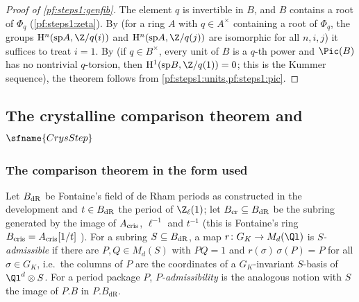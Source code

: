 \begin{proof}[Proof of \cref{pf:steps1:genfib}]
The element $q$ is invertible in $B$, and $B$ contains a root of $\Phi_q$ (\cref{pf:steps1:zeta}). By
 (for a ring $A$ with $q\in A^\times$ containing a
root of $\Phi_q$, the groups $\stepsIH^n(\stepsIsp A,\Z/q(i))$ and $\stepsIH^n(\stepsIsp A,\Z/q(j))$ are isomorphic for
all $n,i,j$) it suffices to treat $i=1$. By  (if $q\in B^\times$, every
unit of $B$ is a $q$-th power and $\Pic(B)$ has no nontrivial $q$-torsion, then $\stepsIH^1(\stepsIsp B,\Z/q(1))=0$; this
is the Kummer sequence), the theorem follows from \cref{pf:steps1:units,pf:steps1:pic}.
\end{proof}

\subsection{The crystalline comparison theorem and $\sfname{CrysStep}$}\label{sec:pf:steps1:cris}

\subsubsection{The comparison theorem in the form used}

\begin{definition}[Admissibility]\label{pf:steps1:def:adm}
Let $B_{\mathrm{dR}}$ be Fontaine's field of de Rham periods as constructed in the development and $t\in B_{\mathrm{dR}}$ the
period of $\Z_\ell(1)$; let $B_{\mathrm{cr}}\subseteq B_{\mathrm{dR}}$ be the subring generated by the image of
$A_{\mathrm{cris}}$, $\ell^{-1}$ and $t^{-1}$ (this is Fontaine's ring $B_{\mathrm{cris}}=A_{\mathrm{cris}}[1/t]$
\cite{Fontaine1994}). For a subring $S\subseteq B_{\mathrm{dR}}$, a map $r\colon G_K\to M_d(\Ql)$ is
\emph{$S$-admissible} if there are $P,Q\in M_d(S)$ with $PQ=1$ and $r(\sigma)\,\sigma(P)=P$ for all $\sigma\in G_K$,
i.e.\ the columns of $P$ are the coordinates of a $G_K$-invariant $S$-basis of $\Ql^d\otimes S$. For a period package
$P$, \emph{$P$-admissibility} is the analogous notion with $S$ the image of $P.B$ in $P.B_{\mathrm{dR}}$.
 
\end{definition}

